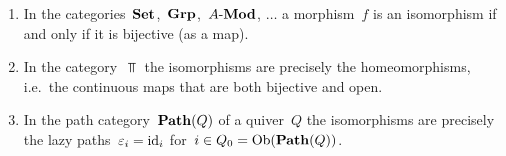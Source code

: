 \begin{example}
  \leavevmode
  \begin{enumerate}
    \item
      In the categories~$\mathbf{Set}$,~$\mathbf{Grp}$,~$\text{$A$-$\mathbf{Mod}$}$, $\dots$ a morphism~$f$ is an isomorphism if and only if it is bijective (as a  map).
    \item
      In the category~$\Top$ the isomorphisms are precisely the homeomorphisms, i.e.\ the continuous maps that are both bijective and open.
    \item
      In the path category~$\mathbf{Path}(Q)$ of a quiver~$Q$ the isomorphisms are precisely the lazy paths~$\varepsilon_i = \operatorname{id}_i$ for~$i \in Q_0 = \operatorname{Ob}(\mathbf{Path}(Q))$.
  \end{enumerate}
\end{example}




